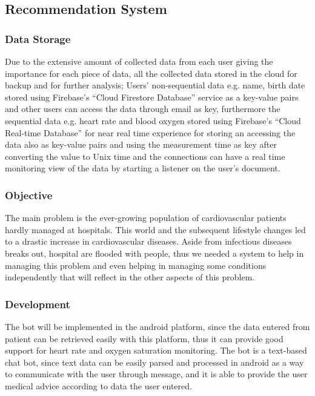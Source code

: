 \documentclass{bmcart}
\begin{document}
\subsection*{Recommendation System}
\subsubsection*{Data Storage}
Due to the extensive amount of collected data from each user giving the
importance for each piece of data, all the collected data stored in the cloud
for backup and for further analysis; Users' non-sequential data e.g. name, birth
date  stored using Firebase's “Cloud Firestore Database” service as a key-value
pairs and other users can access the data through email as key, furthermore the
sequential data e.g. heart rate and blood oxygen stored using Firebase's “Cloud
Real-time Database” for near real time experience for storing an accessing the
data also as key-value pairs and using the measurement time as key after
converting the value to Unix time and the connections can have a real time
monitoring  view of the data by starting a listener on the user's document.

\subsubsection*{Objective}
The main problem is the ever-growing population of cardiovascular patients
hardly managed at hospitals. This world and the subsequent lifestyle changes led
to a drastic increase in cardiovascular diseases. Aside from infectious diseases
breaks out, hospital are flooded with people, thus we needed a system to help in
managing this problem and even helping in managing some conditions independently
that will reflect in the other aspects of this problem.

\subsubsection*{Development}
The bot will be implemented in the android platform, since the data entered from
patient can be retrieved easily with this platform, thus it can provide good
support for heart rate and oxygen saturation monitoring. The bot is a text-based
chat bot, since text data can be easily parsed and processed in android as a way
to communicate with the user through message, and it is able to provide the user
medical advice according to data the user entered.
\end{document}
